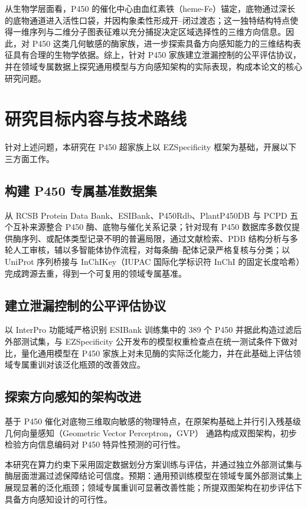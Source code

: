 从生物学层面看，P450 的催化中心由血红素铁（heme-Fe）锚定，底物通过深长的底物通道进入活性口袋，并因构象柔性形成开--闭过渡态\cite{Denisov2005,Cojocaru2007}；这一独特结构特点使得一维序列与二维分子图表征难以充分捕捉决定区域选择性的三维方向信息。因此，对 P450 这类几何敏感的酶家族，进一步探索具备方向感知能力的三维结构表征具有合理的生物学依据。综上，针对 P450 家族建立泄漏控制的公平评估协议，并在领域专属数据上探究通用模型与方向感知架构的实际表现，构成本论文的核心研究问题。

\section{研究目标内容与技术路线}
\label{sec:goals}

针对上述问题，本研究在 P450 超家族上以 EZSpecificity 框架为基础，开展以下三方面工作。

\subsection{构建 P450 专属基准数据集}
\label{subsec:goal-dataset}

从 RCSB Protein Data Bank\cite{Burley2025,Berman2000}、ESIBank\cite{EZSpec2025}、P450Rdb\cite{P450Rdb2024}、PlantP450DB\cite{Nelson2004} 与 PCPD\cite{Wang2021PCPD} 五个互补来源整合 P450 酶、底物与催化关系记录；针对现有 P450 数据库多数仅提供酶序列、或配体类型记录不明的普遍局限，通过文献检索、PDB 结构分析与多轮人工审核，辅以多智能体协作流程，对每条酶--配体记录严格复核与分类；以 UniProt\cite{UniProt2025} 序列桥接与 InChIKey（IUPAC 国际化学标识符 InChI 的固定长度哈希\cite{InChI2015}）完成跨源去重，得到一个可复用的领域专属基准。

\subsection{建立泄漏控制的公平评估协议}
\label{subsec:goal-protocol}

以 InterPro\cite{Blum2025} 功能域严格识别 ESIBank 训练集中的 389 个 P450 并据此构造过滤后外部测试集，与 EZSpecificity 公开发布的模型权重检查点在统一测试条件下做对比，量化通用模型在 P450 家族上对未见酶的实际泛化能力，并在此基础上评估领域专属重训对该泛化瓶颈的改善效应。

\subsection{探索方向感知的架构改进}
\label{subsec:goal-arch}

基于 P450 催化对底物三维取向敏感的物理特点，在原架构基础上并行引入残基级几何向量感知（Geometric Vector Perceptron，GVP）\cite{GVP2021} 通路构成双图架构，初步检验方向信息编码对 P450 特异性预测的可行性。

本研究在算力约束下采用固定数据划分方案训练与评估，并通过独立外部测试集与酶层面泄漏过滤保障结论可信度。预期：通用预训练模型在领域专属外部测试集上展现显著的泛化瓶颈；领域专属重训可显著改善性能；所提双图架构在初步评估下具备方向感知设计的可行性。
